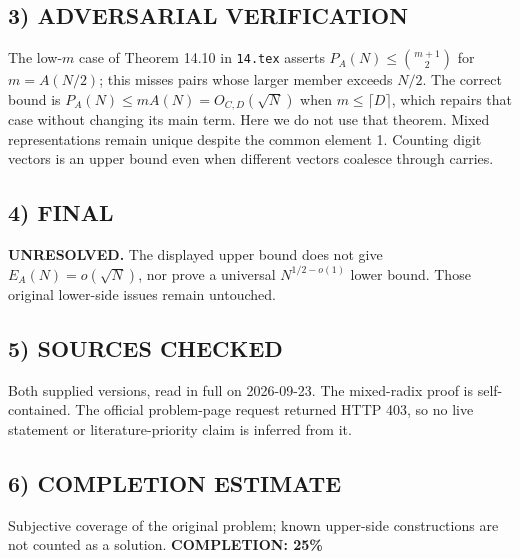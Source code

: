 \subsection*{3) ADVERSARIAL VERIFICATION}
The low-$m$ case of Theorem 14.10 in \texttt{14.tex} asserts $P_A(N)\le\binom{m+1}{2}$ for $m=A(N/2)$; this misses pairs whose larger member exceeds $N/2$. The correct bound is $P_A(N)\le mA(N)=O_{C,D}(\sqrt N)$ when $m\le\lceil D\rceil$, which repairs that case without changing its main term. Here we do not use that theorem. Mixed representations remain unique despite the common element 1. Counting digit vectors is an upper bound even when different vectors coalesce through carries.
\subsection*{4) FINAL}
\textbf{UNRESOLVED.} The displayed upper bound does not give $E_A(N)=o(\sqrt N)$, nor prove a universal $N^{1/2-o(1)}$ lower bound. Those original lower-side issues remain untouched.
\subsection*{5) SOURCES CHECKED}
Both supplied versions, read in full on 2026-09-23. The mixed-radix proof is self-contained. The official problem-page request returned HTTP 403, so no live statement or literature-priority claim is inferred from it.
\subsection*{6) COMPLETION ESTIMATE}
Subjective coverage of the original problem; known upper-side constructions are not counted as a solution.
\textbf{COMPLETION: 25\%}
